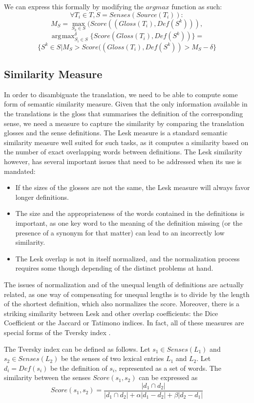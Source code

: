 \documentclass[10pt, a4paper]{article}
\DeclareMathOperator*{\argmax}{arg\!\max}
\begin{document}
We can express this formally by modifying the \(argmax\) function as such:
\[
\forall T_i \in T, S=Senses(Source(T_i)): 
\]
\[
M_S = \max_{S_k\in S}(Score((Gloss(T_i),Def(S^k))),
\]
\[
\argmax_{S_i\in S}^\delta \{Score(Gloss(T_i),Def(S^k))\}=
\]
\[
\{S^k\in S|  M_S > Score((Gloss(T_i),Def(S^k)) > M_S-\delta \}
\]

\subsection{Similarity Measure}
In order to disambiguate the translation, we need to be able to compute some form of semantic similarity measure. Given that the only information available in the translations is the gloss that summarises the definition of the corresponding sense, we need a measure to capture the similarity by comparing the translation glosses and the sense definitions. The Lesk \cite{citeulike:625530} measure is a standard semantic similarity measure well suited for such tasks, as it computes a similarity based on the number of exact overlapping words between definitions. The Lesk similarity however, has several important issues that need to be addressed when its use is mandated: 
\begin{itemize}
	\item If the sizes of the glosses are not the same, the Lesk measure will always favor longer definitions.
	\item The size and the appropriateness of the words contained in the definitions is important, as one key word to the meaning of the definition missing (or the presence of a synonym for that matter) can lead to an incorrectly low similarity.
	\item The Lesk overlap is not in itself normalized, and the normalization process requires some though depending of the distinct problems at hand.
\end{itemize}
 
 The issues of normalization and of the unequal length of definitions are actually related, as one way of compensating for unequal lengths is to divide by the length of the shortest definition, which also normalizes the score. Moreover, there is a striking similarity between Lesk and other overlap coefficients:  the Dice Coefficient or the Jaccard or Tatimono indices. In fact, all of these measures are special forms of the Tversky index \cite{tversky77similarity}.

The Tversky index can be defined as follows. Let \(s_1 \in Senses(L_1)\)  and \(s_2 \in Senses(L_2)\) be the senses of two lexical entries \(L_1\) and \(L_2\). Let \(d_i=Def(s_i)\) be the definition of \(s_i\), represented as a set of words. The similarity between the senses \(Score(s_1, s_2)\) can be expressed as 
\[
Score(s_1,s_2) = 
\frac{|d_1\cap d_2|}{|d_1\cap d_2| + \alpha |d_1-d_2| + \beta |d_2-d_1|}
\]
\end{document}
